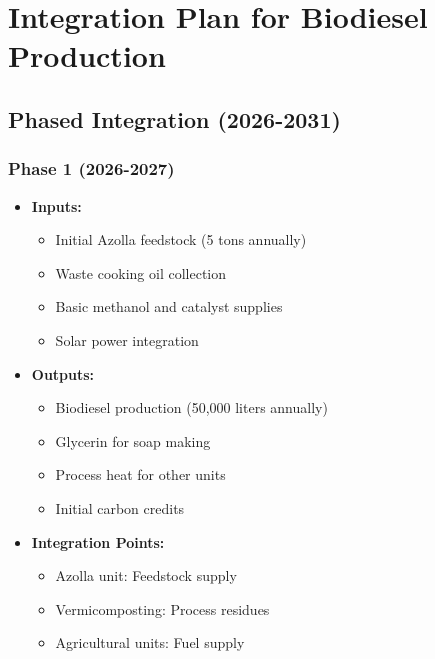 \section{Integration Plan for Biodiesel Production}

\subsection{Phased Integration (2026-2031)}

\subsubsection{Phase 1 (2026-2027)}
\begin{itemize}
    \item \textbf{Inputs:}
    \begin{itemize}
        \item Initial Azolla feedstock (5 tons annually)
        \item Waste cooking oil collection
        \item Basic methanol and catalyst supplies
        \item Solar power integration
    \end{itemize}
    \item \textbf{Outputs:}
    \begin{itemize}
        \item Biodiesel production (50,000 liters annually)
        \item Glycerin for soap making
        \item Process heat for other units
        \item Initial carbon credits
    \end{itemize}
    \item \textbf{Integration Points:}
    \begin{itemize}
        \item Azolla unit: Feedstock supply
        \item Vermicomposting: Process residues
        \item Agricultural units: Fuel supply
    \end{itemize}
\end{itemize}

